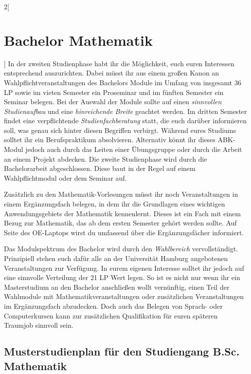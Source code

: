 \begin{multicols}{2}[\section{Bachelor Mathematik}]
In der zweiten Studienphase habt ihr die Möglichkeit, euch euren Interessen
entsprechend auszurichten. Dabei müsst ihr aus einem großen Kanon an
Wahlpflichtveranstaltungen des Bachelors Module im Umfang von insgesamt 36 LP
sowie im vieten Semester ein Proseminar und im fünften Semester ein Seminar
belegen. Bei der Auswahl der Module sollte auf einen \emph{sinnvollen
Studienaufbau} und eine \emph{hinreichende Breite} geachtet werden.  Im dritten
Semester findet eine verpflichtende \emph{Studienfachberatung} statt, die euch
darüber informieren soll, was genau sich hinter diesen Begriffen verbirgt.
Während eures Studiums solltet ihr ein Berufspraktikum absolvieren. Alternativ
könnt ihr dieses ABK-Modul jedoch auch durch das Leiten einer Übungsgruppe oder
durch die Arbeit an einem Projekt abdecken.  Die zweite Studienphase wird durch
die Bachelorarbeit abgeschlossen. Diese baut in der Regel auf einem
Wahlpflichtmodul oder dem Seminar auf.

Zusätzlich zu den Mathematik-Vorlesungen müsst ihr noch Veranstaltungen in
einem Ergänzungsfach belegen, in dem ihr die Grundlagen eines wichtigen
Anwendungsgebiets der Mathematik kennenlernt. Dieses ist ein Fach mit einem
Bezug zur Mathematik, das ab dem ersten Semester gehört werden sollte. Auf
Seite \pageref{page:erg} des OE-Laptops wirst du umfassend über die
Ergänzungsfächer informiert.

Das Modulspektrum des Bachelor wird durch den \emph{Wahlbereich}
vervollständigt. Prinzipiell stehen euch dafür alle an der Universität Hamburg
angebotenen Veranstaltungen zur Verfügung.  In eurem eigenen Interesse solltet
ihr jedoch auf eine sinnvolle Verteilung der 21 LP Wert legen. So ist es nicht
nur wenn ihr ein Masterstudium an den Bachelor anschließen wollt vernünftig,
einen Teil der Wahlmodule mit Mathematikveranstaltungen oder zusätzlichen
Veranstaltungen im Ergänzungsfach abzudecken.  Doch auch das Belegen von
Sprach- oder Computerkursen kann zur zusätzlichen Qualifikation für euren
späteren Traumjob sinnvoll sein.
\end{multicols}
\clearpage

\subsection{Musterstudienplan für den Studiengang B.Sc. Mathematik}

